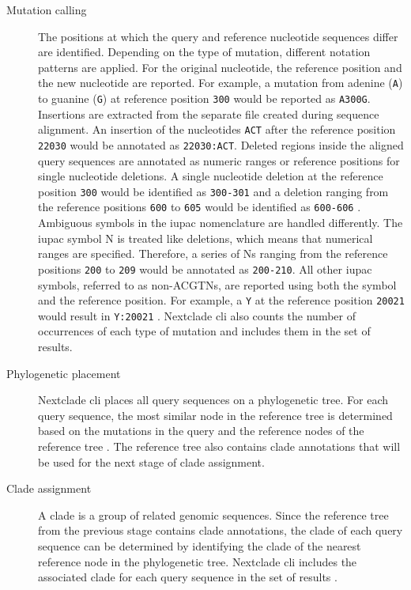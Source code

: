 \begin{description}
    \item[Mutation calling] The positions at which the query and reference nucleotide sequences differ are identified. Depending on the type of mutation, different notation patterns are applied. For  the original nucleotide, the reference position and the new nucleotide are reported. For example, a mutation from adenine (\lstinline|A|) to guanine (\lstinline|G|) at reference position \lstinline|300| would be reported as \lstinline|A300G|. Insertions are extracted from the separate file created during sequence alignment. An insertion of the nucleotides \lstinline|ACT| after the reference position \lstinline|22030| would be annotated as \lstinline|22030:ACT|. Deleted regions inside the aligned query sequences are annotated as numeric ranges or reference positions for single nucleotide deletions. A single nucleotide deletion at the reference position \lstinline|300| would be identified as \lstinline|300-301| and a deletion ranging from the reference positions \lstinline|600| to \lstinline|605| would be identified as \lstinline|600-606| \cite{Nex5}. Ambiguous symbols in the \acrshort{iupac} nomenclature are handled differently. The \acrshort{iupac} symbol N is treated like deletions, which means that numerical ranges are specified. Therefore, a series of Ns ranging from the reference positions \lstinline|200| to \lstinline|209| would be annotated as \lstinline|200-210|. All other \acrshort{iupac} symbols, referred to as non-ACGTNs, are reported using both the symbol and the reference position. For example, a \lstinline|Y| at the reference position \lstinline|20021| would result in \lstinline{Y:20021} \cite{Nex5}. Nextclade \acrshort{cli} also counts the number of occurrences of each type of mutation and includes them in the set of results.
    \item[Phylogenetic placement] Nextclade \acrshort{cli} places all query sequences on a phylogenetic tree. For each query sequence, the most similar node in the reference tree is determined based on the mutations in the query and the reference nodes of the reference tree \cite{Nex6}. The reference tree also contains clade annotations that will be used for the next stage of clade assignment.
    \item[Clade assignment] A clade is a group of related genomic sequences. Since the reference tree from the previous stage contains clade annotations, the clade of each query sequence can be determined by identifying the clade of the nearest reference node in the phylogenetic tree. Nextclade \acrshort{cli} includes the associated clade for each query sequence in the set of results \cite{Nex7}.
\end{description}

